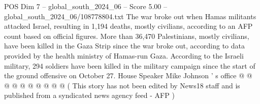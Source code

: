 \begin{textsample}{POS Dim 7 – global\_south\_2024\_06 – Score 5.00 – global\_south\_2024\_06/108778804.txt}
The war broke out when Hamas militants attacked Israel, resulting in 1,194 deaths, mostly civilians, according to an AFP count based on official figures.
More than 36,470 Palestinians, mostly civilians, have been killed in the Gaza Strip since the war broke out, according to data provided by the health ministry of Hamas-run Gaza.
According to the Israeli military, 294 soldiers have been killed in the military campaign since the start of the ground offensive on October 27.
House Speaker Mike Johnson ' s office @ @ @ @ @ @ @ @ @ @ ( This story has not been edited by News18 staff and is published from a syndicated news agency feed - AFP )

\end{textsample}
